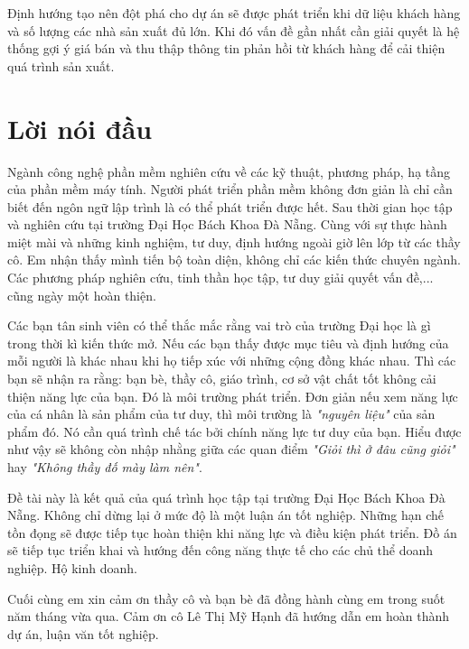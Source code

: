 \documentclass[11pt]{report}
\begin{document}
Định hướng tạo nên đột phá cho dự án sẽ được phát triển khi dữ liệu khách hàng và số lượng các nhà sản xuất đủ lớn. Khi đó vấn đề gần nhất cần giải quyết là hệ thống gợi ý giá bán và thu thập thông tin phản hồi từ khách hàng để cải thiện quá trình sản xuất.

\pagebreak




\setcounter{page}{1}

\chapter*{Lời nói đầu}
\justifying
Ngành công nghệ phần mềm nghiên cứu về các kỹ thuật, phương pháp, hạ tầng của phần mềm máy tính. Người phát triển phần mềm không đơn giản là chỉ cần biết đến ngôn ngữ lập trình là có thể phát triển được hết. Sau thời gian học tập và nghiên cứu tại trường Đại Học Bách Khoa Đà Nẵng. Cùng với sự thực hành miệt mài và những kinh nghiệm, tư duy, định hướng ngoài giờ lên lớp từ các thầy cô. Em nhận thấy mình tiến bộ toàn diện, không chỉ các kiến thức chuyên ngành. Các phương pháp nghiên cứu, tinh thần học tập, tư duy giải quyết vấn đề,... cũng ngày một hoàn thiện.

Các bạn tân sinh viên có thể thắc mắc rằng vai trò của trường Đại học là gì trong thời kì kiến thức mở. Nếu các bạn thấy được mục tiêu và định hướng của mỗi người là khác nhau khi họ tiếp xúc với những cộng đồng khác nhau. Thì các bạn sẽ nhận ra rằng: bạn bè, thầy cô, giáo trình, cơ sở vật chất tốt không cải thiện năng lực của bạn. Đó là môi trường phát triển. Đơn giản nếu xem năng lực của cá nhân là sản phẩm của tư duy, thì môi trường là \emph{"nguyên liệu"} của sản phẩm đó. Nó cần quá trình chế tác bởi chính năng lực tư duy của bạn. Hiểu được như vậy sẽ không còn nhập nhằng giữa các quan điểm \emph{"Giỏi thì ở đâu cũng giỏi"} hay \emph{"Không thầy đố mày làm nên"}.

Đề tài này là kết quả của quá trình học tập tại trường Đại Học Bách Khoa Đà Nẵng. Không chỉ dừng lại ở mức độ là một luận án tốt nghiệp. Những hạn chế tồn đọng sẽ được tiếp tục hoàn thiện khi năng lực và điều kiện phát triển. Đồ án sẽ tiếp tục triển khai và hướng đến công năng thực tế cho các chủ thể doanh nghiệp. Hộ kinh doanh.

Cuối cùng em xin cảm ơn thầy cô và bạn bè đã đồng hành cùng em trong suốt năm tháng vừa qua. Cảm ơn cô Lê Thị Mỹ Hạnh đã hướng dẫn em hoàn thành dự án, luận văn tốt nghiệp.
\end{document}
